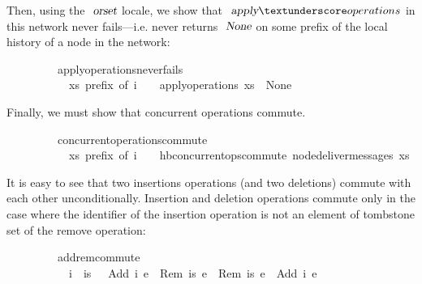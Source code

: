 \noindent Then, using the $\isa{orset}$ locale, we show that
$\isa{apply}{\isacharunderscore}operations$ in this network never fails---i.e.
never returns $\isa{None}$ on some prefix of the local history of a node in the
network:
\vspace{0.35em}
\begin{isabellebody}
\ \ \ \ \ \ \ \ \ apply{\isacharunderscore}operations{\isacharunderscore}never{\isacharunderscore}fails{\isacharcolon}\isanewline
\ \ \ \ \ \ \ \ \ \ \ {\isachardoublequoteopen}xs\ prefix\ of\ i{\isachardoublequoteclose}\ \ \ \ {\isachardoublequoteopen}apply{\isacharunderscore}operations\ xs\ {\isasymnoteq}\ None{\isachardoublequoteclose}
\end{isabellebody}
\vspace{0.35em}
\noindent Finally, we must show that concurrent operations commute.
\vspace{0.35em}
\begin{isabellebody}
\ \ \ \ \ \ \ \ \ concurrent{\isacharunderscore}operations{\isacharunderscore}commute{\isacharcolon}\isanewline
\ \ \ \ \ \ \ \ \ \ \ {\isachardoublequoteopen}xs\ prefix\ of\ i{\isachardoublequoteclose}\ \ \ \ {\isachardoublequoteopen}hb{\isachardot}concurrent{\isacharunderscore}ops{\isacharunderscore}commute\ {\isacharparenleft}node{\isacharunderscore}deliver{\isacharunderscore}messages\ xs{\isacharparenright}{\isachardoublequoteclose}
\end{isabellebody}
\vspace{0.35em}
\noindent It is easy to see that two insertions operations (and two deletions)
commute with each other unconditionally. Insertion and deletion operations
commute only in the case where the identifier of the insertion operation is not
an element of tombstone set of the remove operation:
\vspace{0.35em}
\begin{isabellebody}
\ \ \ \ \ \ \ \ \ add{\isacharunderscore}rem{\isacharunderscore}commute{\isacharcolon}\isanewline
\ \ \ \ \ \ \ \ \ \ \ {\isachardoublequoteopen}i\ {\isasymnotin}\ is{\isachardoublequoteclose}\ \ \ {\isachardoublequoteopen}{\isasymlangle}Add\ i\ e{}{\isasymrangle}\ {\isasymrhd}\ {\isasymlangle}Rem\ is\ e{}{\isasymrangle}\ {\isacharequal}\ {\isasymlangle}Rem\ is\ e{}{\isasymrangle}\ {\isasymrhd}\ {\isasymlangle}Add\ i\ e{}{\isasymrangle}{\isachardoublequoteclose}
\end{isabellebody}
\vspace{0.35em}

